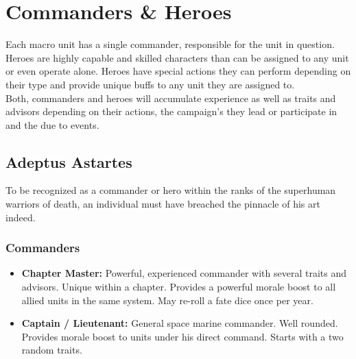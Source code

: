 

 \section{Commanders \& Heroes}
 Each macro unit has a single commander, responsible for the unit in question. Heroes are highly capable and skilled characters than can be assigned to any unit or even operate alone. Heroes have special actions they can perform depending on their type and provide unique buffs to any unit they are assigned to. \\
 Both, commanders and heroes will accumulate experience as well as traits and advisors depending on their actions, the campaign's they lead or participate in and the due to events.
 
\subsection{Adeptus Astartes}
To be recognized as a commander or hero within the ranks of the superhuman warriors of death, an individual must have breached the pinnacle of his art indeed.\\
\subsubsection{Commanders}
\begin{itemize}
    \item \textbf{Chapter Master:} Powerful, experienced commander with several traits and advisors. Unique within a chapter. Provides a powerful morale boost to all allied units in the same system. May re-roll a fate dice once per year.
    \item \textbf{Captain / Lieutenant:} General space marine commander. Well rounded. Provides morale boost to units under his direct command. Starts with a two random traits.

\end{itemize}
